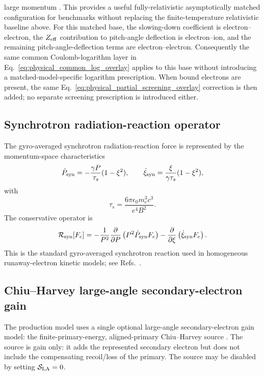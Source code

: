 \documentclass[11pt]{article}
\begin{document}
large momentum \cite{Stahl2016}.  This provides a useful fully-relativistic asymptotically matched configuration for
benchmarks without replacing the finite-temperature relativistic baseline above.  For this matched base, the slowing-down coefficient is electron--electron, the
$Z_{\rm eff}$ contribution to pitch-angle deflection is electron--ion, and the remaining
pitch-angle-deflection terms are electron--electron.  Consequently the same common
Coulomb-logarithm layer in Eq.~\eqref{eq:physical_common_log_overlay} applies to this
base without introducing a matched-model-specific logarithm prescription.  When bound
electrons are present, the same Eq.~\eqref{eq:physical_partial_screening_overlay}
correction is then added; no separate screening prescription is introduced either.

\subsection{Synchrotron radiation-reaction operator}

The gyro-averaged synchrotron radiation-reaction force is represented by the
momentum-space characteristics
\begin{equation}
 \dot P_{\rm syn}
 =-\frac{\gamma P}{\tau_s}(1-\xi^2),
 \qquad
 \dot\xi_{\rm syn}
 =\frac{\xi}{\gamma\tau_s}(1-\xi^2),
 \label{eq:synch_characteristics}
\end{equation}
with
\begin{equation}
 \tau_s=\frac{6\pi\epsilon_0m_e^3c^3}{e^4B^2}.
 \label{eq:synch_time}
\end{equation}
The conservative operator is
\begin{equation}
 \mathcal R_{\rm syn}[F_e]
 =-\frac{1}{P^2}\frac{\partial}{\partial P}
   \left(P^2\dot P_{\rm syn}F_e\right)
  -\frac{\partial}{\partial\xi}
   \left(\dot\xi_{\rm syn}F_e\right).
 \label{eq:synch_operator_dimensional}
\end{equation}
This is the standard gyro-averaged synchrotron reaction used in homogeneous
runaway-electron kinetic models; see Refs.~\cite{Andersson2001}.

\subsection{Chiu--Harvey large-angle secondary-electron gain}

The production model uses a single optional large-angle secondary-electron gain model:
the finite-primary-energy, aligned-primary Chiu--Harvey source
\cite{Chiu1998,Harvey2000}.  The source is gain only: it adds the represented
secondary electron but does not include the compensating recoil/loss of the primary.
The source may be disabled by setting $\mathcal S_{\rm LA}=0$.
\end{document}
